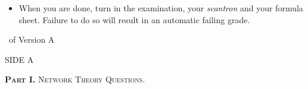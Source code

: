 \documentclass[legalpaper, 12pt, addpoints]{exam}
\begin{document}
\begin{coverpages}
\begin{center}
{{{\begin{itemize}
    \item When you are done, turn in the examination, your \textit{scantron} and your formula sheet. Failure to do so will result in an automatic failing grade.


    
\end{itemize} }}}
\vspace{0.2in}
\end{center}
\vspace{0.15in}
\runningheadrule \extraheadheight{0.14in}

              {\thepage\ of \numpages}
              {Version A}
\vspace{0.15in}

\vspace{0.1in}

\nopointsinmargin
\setlength\linefillthickness{0.1pt}
\setlength\answerlinelength{0.1in}
\end{coverpages}

\parbox{6in}{\textsc{{SIDE A}}

\vspace{0.15in}

\parbox{5in}{
{\textsc{\textbf{Part I.} Network Theory Questions.}}}}
\end{document}
